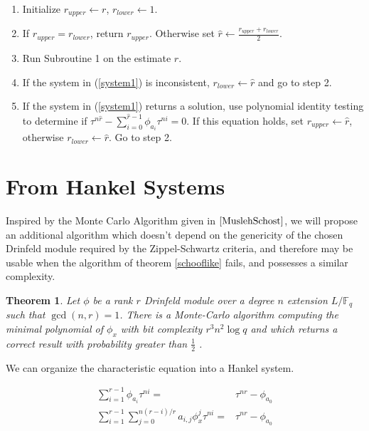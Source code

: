 \documentclass[sigconf]{acmart}
\newtheorem{theorem}{Theorem}
\newcommand{\F}{\mathbb{F}}
\newcommand{\hatr}{\hat{r}}
\begin{document}
\begin{enumerate}
    \item Initialize $r_{upper} \leftarrow r$, $r_{lower} \leftarrow 1$.
    \item If $r_{upper} = r_{lower}$, return $r_{upper}$. Otherwise set $\hatr \leftarrow \frac{r_{upper} + r_{lower}}{2}$.
    \item Run Subroutine 1 on the estimate $\hatr$.
    \item If the system in (\ref{system1}) is inconsistent, $r_{lower} \leftarrow \hatr$ and go to step 2.
    \item If the system in (\ref{system1}) returns a solution, use polynomial identity testing to determine if $\tau^{n \hatr} - \sum_{i = 0}^{\hatr - 1} \phi_{a_i}\tau^{ni} = 0$. If this equation holds, set $r_{upper} \leftarrow \hatr$, otherwise $r_{lower} \leftarrow \hatr$. Go to step 2.
    
\end{enumerate}





\section{From Hankel Systems}
Inspired by the Monte Carlo Algorithm given in $\cite{MuslehSchost}$, we will propose an additional algorithm which doesn't depend on the genericity of the chosen Drinfeld module required by the Zippel-Schwartz criteria, and therefore may be usable when the algorithm of theorem \ref{schooflike} fails, and possesses a similar complexity.
\begin{theorem}\label{hankel}
Let $\phi$ be a rank $r$ Drinfeld module over a degree $n$ extension $L/\F_q$ such that $\gcd(n, r) = 1$. There is a Monte-Carlo algorithm computing the minimal polynomial of $\phi_x$ with bit complexity $r^{3}n^2 \log q$ and which returns a correct result with probability greater than $\frac{1}{2}$ .
\end{theorem}

 We can organize the characteristic equation into a Hankel system.

\begin{align*}
\sum_{i=1}^{r - 1} \phi_{a_i}\tau^{ni} = &  \tau^{nr} - \phi_{a_0}
\\
\sum_{i=1}^{r - 1} \sum_{j=0}^{n(r-i)/r}a_{i,j}\phi_{x}^j\tau^{ni} = & \tau^{nr} - \phi_{a_0}
\end{align*}
\end{document}
